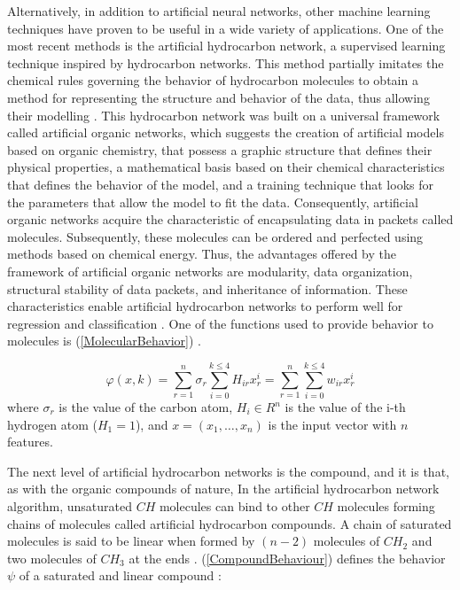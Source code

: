 \documentclass{ieeeaccess}
\begin{document}
Alternatively, in addition to artificial neural networks, other machine learning techniques have proven to be useful in a wide variety of applications. One of the most recent methods is the artificial hydrocarbon network, a supervised learning technique inspired by hydrocarbon networks. This method partially imitates the chemical rules governing the behavior of hydrocarbon molecules to obtain a method for representing the structure and behavior of the data, thus allowing their modelling \cite{ponce_comparative_2020}. This hydrocarbon network was built on a universal framework called artificial organic networks, which suggests the creation of artificial models based on organic chemistry, that possess a graphic structure that defines their physical properties, a mathematical basis based on their chemical characteristics that defines the behavior of the model, and a training technique that looks for the parameters that allow the model to fit the data. Consequently, artificial organic networks acquire the characteristic of encapsulating data in packets called molecules. Subsequently, these molecules can be ordered and perfected using methods based on chemical energy. Thus, the advantages offered by the framework of artificial organic networks are modularity, data organization, structural stability of data packets, and inheritance of information. These characteristics enable artificial hydrocarbon networks to perform well for regression and classification \cite{ponce_stochastic_2020}. One of the functions used to provide behavior to molecules is (\ref{MolecularBehavior}) \cite{ponce_stochastic_2020}.

\begin{equation}\label{MolecularBehavior}
 \varphi(x,k)=\sum_{r=1}^{n}{\sigma_r\sum_{i=0}^{k\le4}{H_{ir}x_r^i}}=\sum_{r=1}^{n}\sum_{i=0}^{k\le4}{w_{ir}x_r^i}
\end{equation}
where \(\sigma_r\) is the value of the carbon atom, \(H_i \in R^n\) is the value of the i-th hydrogen atom (\(H_1 = 1\)), and \( x = (x_1,\dots,x_n)\) is the input vector with \(n\) features.

The next level of artificial hydrocarbon networks is the compound, and it is that, as with the organic compounds of nature, In the artificial hydrocarbon network algorithm, unsaturated \(CH\) molecules can bind to other \(CH\) molecules forming chains of molecules called artificial hydrocarbon compounds. A chain of saturated molecules is said to be linear when formed by \((n - 2)\) molecules of \(CH_2\) and two molecules of \(CH_3\) at the ends \cite{ponce_reinforcement_2018}. (\ref{CompoundBehaviour}) defines the behavior \(\psi\) of a saturated and linear compound \cite{ponce_stochastic_2020}:
\end{document}
